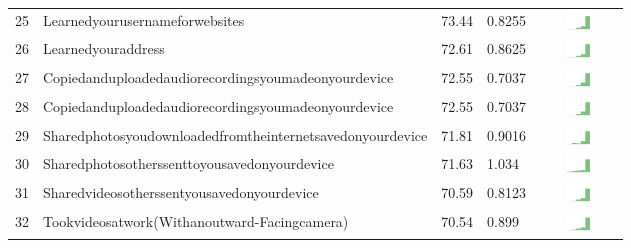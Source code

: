 \documentclass[a4paper,12pt]{article}
\begin{document}
\begin{longtable}{| p{0.5cm} | p{7cm} | p{1cm} |p{1cm} | c |}
25 & Learnedyourusernameforwebsites & 73.44&0.8255 & \includegraphics[width = 2cm, height = 0.5cm]{tables/learnedyourusernameforwebsitescombined} \\ 
26 & Learnedyouraddress & 72.61&0.8625 & \includegraphics[width = 2cm, height = 0.5cm]{tables/learnedyouraddresscombined} \\ 
27 & Copiedanduploadedaudiorecordingsyoumadeonyourdevice & 72.55&0.7037 & \includegraphics[width = 2cm, height = 0.5cm]{tables/copiedanduploadedaudiorecordingsyoumadeonyourdevicecombined} \\ 
28 & Copiedanduploadedaudiorecordingsyoumadeonyourdevice & 72.55&0.7037 & \includegraphics[width = 2cm, height = 0.5cm]{tables/copiedanduploadedaudiorecordingsyoumadeonyourdevicecombined} \\ 
29 & Sharedphotosyoudownloadedfromtheinternetsavedonyourdevice & 71.81&0.9016 & \includegraphics[width = 2cm, height = 0.5cm]{tables/sharedphotosyoudownloadedfromtheinternetsavedonyourdevicecombined} \\ 
30 & Sharedphotosotherssenttoyousavedonyourdevice & 71.63&1.034 & \includegraphics[width = 2cm, height = 0.5cm]{tables/sharedphotosotherssenttoyousavedonyourdevicecombined} \\ 
31 & Sharedvideosotherssentyousavedonyourdevice & 70.59&0.8123 & \includegraphics[width = 2cm, height = 0.5cm]{tables/sharedvideosotherssentyousavedonyourdevicecombined} \\ 
32 & Tookvideosatwork(Withanoutward-Facingcamera) & 70.54&0.899 & \includegraphics[width = 2cm, height = 0.5cm]{tables/tookvideosatwork(withanoutward-facingcamera)combined} \\ 

\end{longtable}
\end{document}
